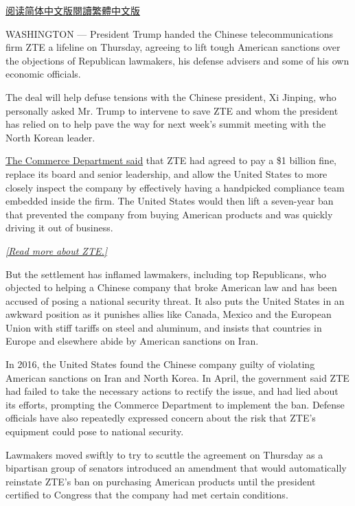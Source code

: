\href{https://cn.nytimes.com/business/20180608/us-china-zte-deal/}{阅读简体中文版}\href{https://cn.nytimes.com/business/20180608/us-china-zte-deal/zh-hant/}{閱讀繁體中文版}

WASHINGTON --- President Trump handed the Chinese telecommunications
firm ZTE a lifeline on Thursday, agreeing to lift tough American
sanctions over the objections of Republican lawmakers, his defense
advisers and some of his own economic officials.

The deal will help defuse tensions with the Chinese president, Xi
Jinping, who personally asked Mr. Trump to intervene to save ZTE and
whom the president has relied on to help pave the way for next week's
summit meeting with the North Korean leader.

\href{https://www.commerce.gov/news/press-releases/2018/06/secretary-ross-announces-14-billion-zte-settlement-zte-board-management}{The
Commerce Department said} that ZTE had agreed to pay a \$1 billion fine,
replace its board and senior leadership, and allow the United States to
more closely inspect the company by effectively having a handpicked
compliance team embedded inside the firm. The United States would then
lift a seven-year ban that prevented the company from buying American
products and was quickly driving it out of business.

\href{https://www.nytimes.com/2018/06/07/business/what-is-zte.html}{\emph{{[}Read
more about ZTE.{]}}}

But the settlement has inflamed lawmakers, including top Republicans,
who objected to helping a Chinese company that broke American law and
has been accused of posing a national security threat. It also puts the
United States in an awkward position as it punishes allies like Canada,
Mexico and the European Union with stiff tariffs on steel and aluminum,
and insists that countries in Europe and elsewhere abide by American
sanctions on Iran.

In 2016, the United States found the Chinese company guilty of violating
American sanctions on Iran and North Korea. In April, the government
said ZTE had failed to take the necessary actions to rectify the issue,
and had lied about its efforts, prompting the Commerce Department to
implement the ban. Defense officials have also repeatedly expressed
concern about the risk that ZTE's equipment could pose to national
security.

Lawmakers moved swiftly to try to scuttle the agreement on Thursday as a
bipartisan group of senators introduced an amendment that would
automatically reinstate ZTE's ban on purchasing American products until
the president certified to Congress that the company had met certain
conditions.

